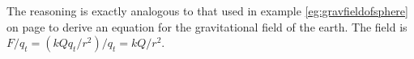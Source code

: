 The reasoning is exactly analogous to that used in
example  \ref{eg:gravfieldofsphere} on page \pageref{eg:gravfieldofsphere} to
derive an equation for the gravitational field of the earth. The field is
$F/q_t=(kQq_t/r^2)/q_t=kQ/r^2$.



